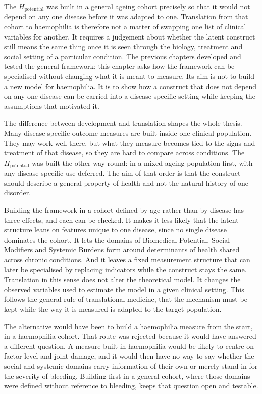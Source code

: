 The $H_{\text{potential}}$ was built in a general ageing cohort precisely so that it would not depend on any one disease before it was adapted to one. Translation from that cohort to haemophilia is therefore not a matter of swapping one list of clinical variables for another. It requires a judgement about whether the latent construct still means the same thing once it is seen through the biology, treatment and social setting of a particular condition. The previous chapters developed and tested the general framework; this chapter asks how the framework can be specialised without changing what it is meant to measure. Its aim is not to build a new model for haemophilia. It is to show how a construct that does not depend on any one disease can be carried into a disease-specific setting while keeping the assumptions that motivated it.

The difference between development and translation shapes the whole thesis. Many disease-specific outcome measures are built inside one clinical population. They may work well there, but what they measure becomes tied to the signs and treatment of that disease, so they are hard to compare across conditions. The $H_{\text{potential}}$ was built the other way round: in a mixed ageing population first, with any disease-specific use deferred. The aim of that order is that the construct should describe a general property of health and not the natural history of one disorder.

Building the framework in a cohort defined by age rather than by disease has three effects, and each can be checked. It makes it less likely that the latent structure leans on features unique to one disease, since no single disease dominates the cohort. It lets the domains of Biomedical Potential, Social Modifiers and Systemic Burdens form around determinants of health shared across chronic conditions. And it leaves a fixed measurement structure that can later be specialised by replacing indicators while the construct stays the same. Translation in this sense does not alter the theoretical model. It changes the observed variables used to estimate the model in a given clinical setting. This follows the general rule of translational medicine, that the mechanism must be kept while the way it is measured is adapted to the target population.

The alternative would have been to build a haemophilia measure from the start, in a haemophilia cohort. That route was rejected because it would have answered a different question. A measure built in haemophilia would be likely to centre on factor level and joint damage, and it would then have no way to say whether the social and systemic domains carry information of their own or merely stand in for the severity of bleeding. Building first in a general cohort, where those domains were defined without reference to bleeding, keeps that question open and testable.

